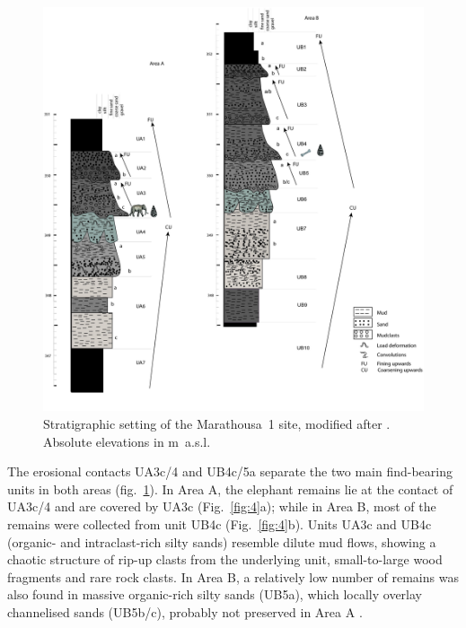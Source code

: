 \documentclass[preprint,authoryear,times]{elsarticle} %
\begin{document}
\begin{figure}[]
  \centering
  \includegraphics[width=1\textwidth]{../artwork/Fig3.pdf}
  \caption{Stratigraphic setting of the Marathousa~1 site, modified after \cite{Karkanas}. Absolute elevations in m~a.s.l.}
  \label{fig:3}
\end{figure}

The erosional contacts UA3c/4 and UB4c/5a separate the two main find-bearing units in both areas (fig.~\ref{fig:3}). In Area A, the elephant remains lie at the contact of UA3c/4 and are covered by UA3c (Fig.~\ref{fig:4}a); while in Area B, most of the remains were collected from unit UB4c (Fig.~\ref{fig:4}b). Units UA3c and UB4c (organic- and intraclast-rich silty sands) resemble dilute mud flows, showing a chaotic structure of rip-up clasts from the underlying unit, small-to-large wood fragments and rare rock clasts. In Area B, a relatively low number of remains was also found in massive organic-rich silty sands (UB5a), which locally overlay channelised sands (UB5b/c), probably not preserved in Area A \citep{Karkanas}.
\end{document}
